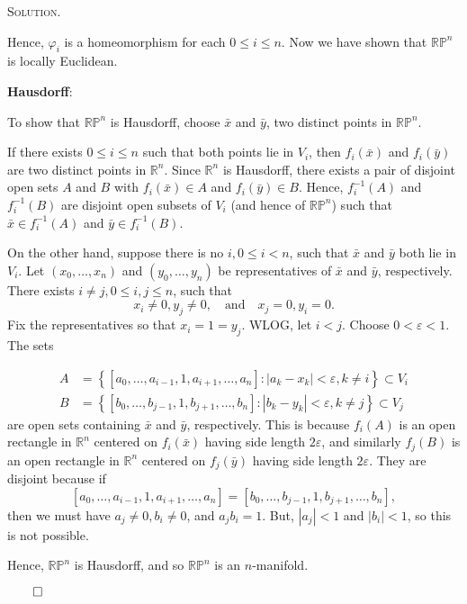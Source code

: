 \documentclass[12pt, a4paper, oneside]{ctexart}
\newenvironment{solution}{%
	\par\noindent\textsc{Solution. }\ignorespaces
}{%
	\hfill$\qed$\par
}
\begin{document}
\begin{solution}
	Hence, \(\varphi_i\) is a homeomorphism for each \(0 \leq i \leq n\). Now we have shown
	that \(\mathbb{RP}^n\) is locally Euclidean.

	\textbf{Hausdorff}:

	To show that \(\mathbb{RP}^n\) is Hausdorff, choose \(\bar{x}\) and \(\bar{y}\), two distinct points in \(\mathbb{RP}^n\).

	If there exists \(0 \leq i \leq n\) such that both points lie in \(V_i\), then 
	\(f_i(\bar{x})\) and \(f_i(\bar{y})\) are two distinct points in \(\mathbb{R}^n\). 
	Since \(\mathbb{R}^n\) is Hausdorff, there exists a pair of disjoint open sets 
	\(A\) and \(B\) with \(f_i(\bar{x}) \in A\) and \(f_i(\bar{y}) \in B\). 
	Hence, \(f_i^{-1}(A)\) and \(f_i^{-1}(B)\) are disjoint open subsets of \(V_i\) 
	(and hence of \(\mathbb{RP}^n\)) such that \(\bar{x} \in f_i^{-1}(A)\) and \(\bar{y} \in f_i^{-1}(B)\).

	On the other hand, suppose there is no \(i, 0 \leq i < n\), 
	such that \(\bar{x}\) and \(\bar{y}\) both lie in \(V_i\). 
	Let \((x_0, \dots, x_n)\) and \((y_0, \dots, y_n)\) be representatives of \(\bar{x}\) and 
	\(\bar{y}\), respectively. There exists \(i \neq j, 0 \leq i, j \leq n\), such that 
	\[
	x_i \neq 0, y_j \neq 0, \quad \text{and} \quad x_j = 0, y_i = 0.
	\]
	Fix the representatives so that \(x_i = 1 = y_j\). WLOG, let \(i < j\). 
	Choose \(0 < \varepsilon < 1\). The sets 
	
	\begin{align*}
		A &= \left\{ [a_0, \dots, a_{i-1}, 1, a_{i+1}, \dots, a_n] : |a_k - x_k| < \varepsilon, k \neq i \right\} \subset V_i\\ 
		B &= \left\{ [b_0, \dots, b_{j-1}, 1, b_{j+1}, \dots, b_n] : |b_k - y_k| < \varepsilon, k \neq j \right\} \subset V_j
	\end{align*}
	are open sets containing \(\bar{x}\) and \(\bar{y}\), respectively. 
	This is because \(f_i(A)\) is an open rectangle in \(\mathbb{R}^n\) 
	centered on \(f_i(\bar{x})\) having side length \(2\varepsilon\), 
	and similarly \(f_j(B)\) is an open rectangle in \(\mathbb{R}^n\) 
	centered on \(f_j(\bar{y})\) having side length \(2\varepsilon\). 
	They are disjoint because if 
	\[
	[a_0, \dots, a_{i-1}, 1, a_{i+1}, \dots, a_n] = [b_0, \dots, b_{j-1}, 1, b_{j+1}, \dots, b_n], 
	\]
	then we must have \(a_j \neq 0, b_i \neq 0\), and \(a_j b_i = 1\). But, \(|a_j| < 1\) and \(|b_i| < 1\), so this is not possible.

	Hence, \(\mathbb{RP}^n\) is Hausdorff, and so \(\mathbb{RP}^n\) is an \(n\)-manifold.

	\end{solution}
\end{document}
